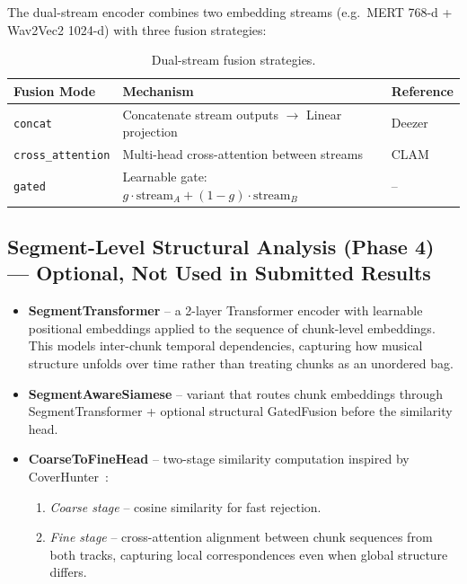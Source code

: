\documentclass[11pt,a4paper]{article}
\begin{document}
The dual-stream encoder combines two embedding streams (e.g.\ MERT 768-d + Wav2Vec2 1024-d) with three fusion strategies:

\begin{table}[H]
\centering
\begin{tabular}{lll}
\toprule
\textbf{Fusion Mode} & \textbf{Mechanism} & \textbf{Reference} \\
\midrule
\texttt{concat} & Concatenate stream outputs $\to$ Linear projection & Deezer~\cite{B3} \\
\texttt{cross\_attention} & Multi-head cross-attention between streams & CLAM~\cite{A4} \\
\texttt{gated} & Learnable gate: $g \cdot \text{stream}_A + (1-g) \cdot \text{stream}_B$ & -- \\
\bottomrule
\end{tabular}
\caption{Dual-stream fusion strategies.}
\end{table}

\subsection{Segment-Level Structural Analysis (Phase 4) --- Optional, Not Used in Submitted Results}
\label{sec:segment-transformer}

\begin{itemize}[nosep]
  \item \textbf{SegmentTransformer} -- a 2-layer Transformer encoder with learnable positional embeddings applied to the sequence of chunk-level embeddings. This models inter-chunk temporal dependencies, capturing how musical structure unfolds over time rather than treating chunks as an unordered bag.
  \item \textbf{SegmentAwareSiamese} -- variant that routes chunk embeddings through SegmentTransformer + optional structural GatedFusion before the similarity head.
  \item \textbf{CoarseToFineHead} -- two-stage similarity computation inspired by CoverHunter~\cite{C1}:
    \begin{enumerate}[nosep]
      \item \textit{Coarse stage} -- cosine similarity for fast rejection.
      \item \textit{Fine stage} -- cross-attention alignment between chunk sequences from both tracks, capturing local correspondences even when global structure differs.
    \end{enumerate}
\end{itemize}
\end{document}
